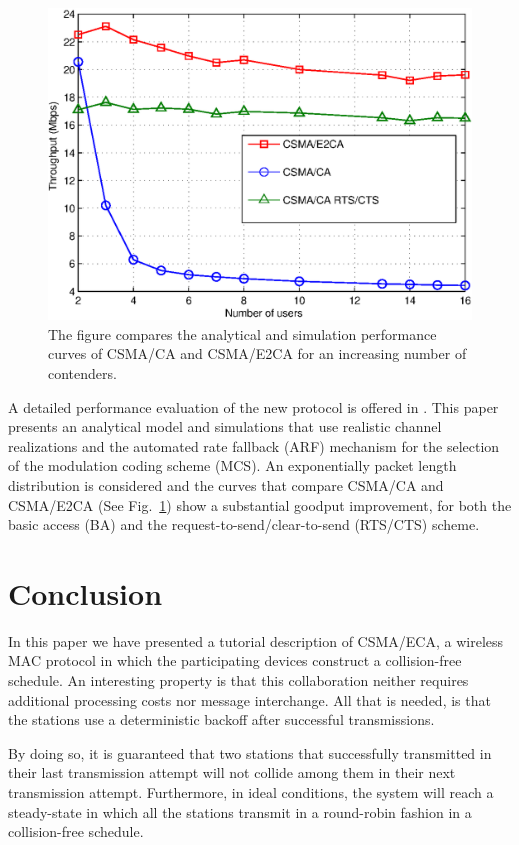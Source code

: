 \documentclass[journal]{IEEEtran}
\begin{document}
\begin{figure}[!t]
\centering
\includegraphics[width=\linewidth]{figures/performance}
\caption{The figure compares the analytical and simulation performance curves of CSMA/CA and CSMA/E2CA for an increasing number of contenders.}
\label{fig:performance}
\end{figure}

A detailed performance evaluation of the new protocol is offered in \cite{martorell2012pec}.
This paper presents an analytical model and simulations that use realistic channel realizations and the automated rate fallback (ARF) mechanism for the selection of the modulation coding scheme (MCS).
An exponentially packet length distribution is considered and the curves that compare CSMA/CA and CSMA/E2CA (See Fig.~\ref{fig:performance}) show a substantial goodput improvement, for both the basic access (BA) and the request-to-send/clear-to-send (RTS/CTS) scheme.


\section{Conclusion} \label{sec:conclusion}
In this paper we have presented a tutorial description of CSMA/ECA, a wireless MAC protocol in which the participating devices construct a collision-free schedule.
An interesting property is that this collaboration neither requires additional processing costs nor message interchange.
All that is needed, is that the stations use a deterministic backoff after successful transmissions.

By doing so, it is guaranteed that two stations that successfully transmitted in their last transmission attempt will not collide among them in their next transmission attempt.
Furthermore, in ideal conditions, the system will reach a steady-state in which all the stations transmit in a round-robin fashion in a collision-free schedule.
\end{document}
